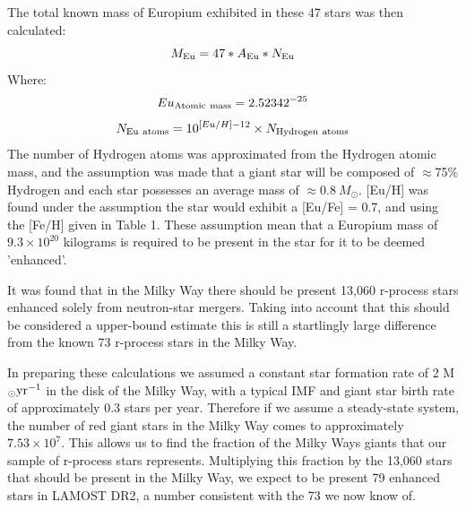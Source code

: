 \documentclass[a4paper,fleqn,usenatbib]{mnras}
\begin{document}
	The total known mass of Europium exhibited in these 47 stars was then calculated:
	\begin{equation}
	M_{\rm{Eu}} = 47*A_{\textrm{Eu}}*N_{\textrm{Eu}}
	\end{equation}
	Where:
	\begin{equation}
	Eu_{\rm{Atomic\ mass}} = 2.52342^{-25}
	\end{equation}
	\begin{equation}
	N_{\rm{Eu\ atoms}} = 10^{[Eu/H]-12} \times N_{\rm{Hydrogen\ atoms}}
	\end{equation}
	The number of Hydrogen atoms was approximated from the Hydrogen atomic mass, and the assumption was made that a giant star will be composed of $\approx$75\% Hydrogen and each star possesses an average mass of $\approx 0.8\ M_{\odot}$. [Eu/H] was found under the assumption the star would exhibit a [Eu/Fe] = 0.7, and using the [Fe/H] given in Table 1. These assumption mean that a Europium mass of $9.3 \times 10^{20}$ kilograms is required to be present in the star for it to be deemed 'enhanced'.
	
    It was found that in the Milky Way there should be present 13,060 r-process stars enhanced solely from neutron-star mergers. Taking into account that this should be considered a upper-bound estimate this is still a startlingly large difference from the known 73 r-process stars in the Milky Way.
    
    In preparing these calculations we assumed a constant star formation rate of 2 M$_\odot {\rm yr}^{-1}$ in the disk of the Milky Way, with a typical IMF and giant star birth rate of approximately 0.3 stars per year. Therefore if we assume a steady-state system, the number of red giant stars in the Milky Way comes to approximately $7.53\times10^7$. This allows us to find the fraction of the Milky Ways giants that our sample of r-process stars represents. Multiplying this fraction by the 13,060 stars that should be present in the Milky Way, we expect to be present 79 enhanced stars in LAMOST DR2, a number consistent with the 73 we now know of.
    
    
\end{document}
